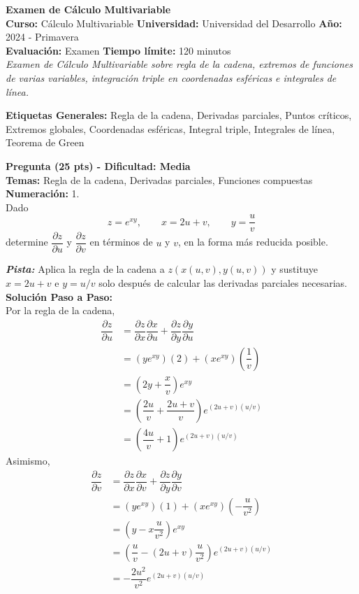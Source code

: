 \documentclass[12pt]{article}
\newcommand{\evalMeta}[9]{
  \begin{center}
    {\Large \textbf{#2}}\\[0.2cm]
    \textbf{Curso:} #4 \quad \textbf{Universidad:} #5 \quad \textbf{Año:} #6 - #7\\[0.1cm]
    \textbf{Evaluación:} #8 \quad \textbf{Tiempo límite:} #9 minutos\\[0.3cm]
    \textit{#3}
  \end{center}
  \vspace{0.5cm}
}
\newcommand{\evalTags}[1]{
  \textbf{Etiquetas Generales:} #1 \vspace{0.5cm}
}
\newenvironment{pregunta}[4]{
  \vspace{0.3cm}\noindent\textbf{Pregunta (#2 pts) - Dificultad: #3}\\
  \textbf{Temas:} #4\\[0.2cm]
}{
  \vspace{0.3cm}
}
\newcommand{\numeracion}[1]{
  \vspace{-0.3cm}\noindent\textbf{Numeración:} #1 \\
}
\newcommand{\pista}[1]{
  \noindent \textbf{\textsl{Pista:}} #1 \\
}
\newenvironment{solucion}{
  \vspace{0.2cm}
  \noindent \textbf{Solución Paso a Paso:}\\[0.1cm]
}{
  \vspace{0.2cm}
}
\begin{document}
\evalMeta
  {examen-calculo-multivariable-2024-primavera}
  {Examen de Cálculo Multivariable}
  {Examen de Cálculo Multivariable sobre regla de la cadena, extremos de funciones de varias variables, integración triple en coordenadas esféricas e integrales de línea.}
  {Cálculo Multivariable}
  {Universidad del Desarrollo}
  {2024}
  {Primavera}
  {Examen}
  {120}

\evalTags{Regla de la cadena, Derivadas parciales, Puntos críticos, Extremos globales, Coordenadas esféricas, Integral triple, Integrales de línea, Teorema de Green}

\begin{pregunta}{examen-mv-2024-p1}{25}{Media}{Regla de la cadena, Derivadas parciales, Funciones compuestas}
\numeracion{1.}
Dado
$$
z=e^{xy},\qquad x=2u+v,\qquad y=\dfrac{u}{v}
$$
determine $\dfrac{\partial z}{\partial u}$ y $\dfrac{\partial z}{\partial v}$ en términos de $u$ y $v$, en la forma más reducida posible.

\pista{Aplica la regla de la cadena a $z(x(u,v),y(u,v))$ y sustituye $x=2u+v$ e $y=u/v$ solo después de calcular las derivadas parciales necesarias.}

\begin{solucion}
Por la regla de la cadena,
$$
\begin{aligned}
\dfrac{\partial z}{\partial u}
&=\dfrac{\partial z}{\partial x}\dfrac{\partial x}{\partial u}
 +\dfrac{\partial z}{\partial y}\dfrac{\partial y}{\partial u}\\
&=(ye^{xy})(2)+(xe^{xy})\left(\dfrac{1}{v}\right)\\
&=\left(2y+\dfrac{x}{v}\right)e^{xy}\\
&=\left(\dfrac{2u}{v}+\dfrac{2u+v}{v}\right)e^{(2u+v)(u/v)}\\
&=\left(\dfrac{4u}{v}+1\right)e^{(2u+v)(u/v)}
\end{aligned}
$$
Asimismo,
$$
\begin{aligned}
\dfrac{\partial z}{\partial v}
&=\dfrac{\partial z}{\partial x}\dfrac{\partial x}{\partial v}
 +\dfrac{\partial z}{\partial y}\dfrac{\partial y}{\partial v}\\
&=(ye^{xy})(1)+(xe^{xy})\left(-\dfrac{u}{v^2}\right)\\
&=\left(y-x\dfrac{u}{v^2}\right)e^{xy}\\
&=\left(\dfrac{u}{v}-(2u+v)\dfrac{u}{v^2}\right)e^{(2u+v)(u/v)}\\
&=-\dfrac{2u^2}{v^2}e^{(2u+v)(u/v)}
\end{aligned}
$$
\end{solucion}


\end{pregunta}
\end{document}
